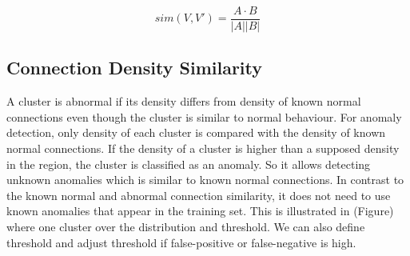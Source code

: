 \begin{equation}
    sim(V, V') = \frac{A \cdot B}{|A| |B|}
\end{equation}

\subsection{Connection Density Similarity}
\label{subsec:densitysimilarity}
A cluster is abnormal if its density differs from density of known normal connections even though the cluster is similar to normal behaviour. 
For anomaly detection, only density of each cluster is compared with the density of known normal connections. 
If the density of a cluster is higher than a supposed density in the region, the cluster is classified as an anomaly. 
So it allows detecting unknown anomalies which is similar to known normal connections. 
In contrast to the known normal and abnormal connection similarity, it does not need to use known anomalies that appear in the training set. 
This is illustrated in (Figure) where one cluster over the distribution and threshold. 
We can also define threshold and adjust threshold if false-positive or false-negative is high. 


